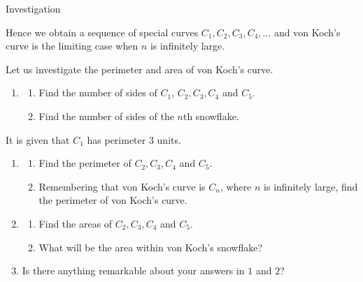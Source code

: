 \documentclass[11pt,a4paper]{book}
\begin{document}
\begin{investigation}[colbacktitle=green]{Investigation}
\medskip{}

Hence we obtain a sequence of special curves $C_{1},C_{2},C_{3},C_{4},\ldots$
and von Koch's curve is the limiting case when $n$ is infinitely
large.

\medskip{}

Let us investigate the perimeter and area of von Koch's curve.

\medskip{}

\begin{enumerate}

\item \begin{enumerate}[label=(\alph*)]

\item  Find the number of sides of $C_{1}$, $C_{2},C_{3},C_{4}$
and $C_{5}$.

\item  Find the number of sides of the $n\text{th}$ snowflake. 

\end{enumerate}

\end{enumerate}

It is given that $C_{1}$ has perimeter $3$ units. 

\begin{enumerate}[start=2]

\item \begin{enumerate}[label=(\alph*)]

\item  Find the perimeter of $C_{2},C_{3},C_{4}$ and $C_{5}$.

\item  Remembering that von Koch's curve is $C_{n}$, where $n$
is infinitely large, find the perimeter of von Koch's curve.

\end{enumerate}

\item \begin{enumerate}[label=(\alph*)]

\item  Find the areas of $C_{2},C_{3},C_{4}$ and $C_{5}$.

\item  What will be the area within von Koch's snowflake?

\end{enumerate}

\item  Is there anything remarkable about your answers in $1$ and
$2$?

\end{enumerate}
\end{investigation}
\end{document}
